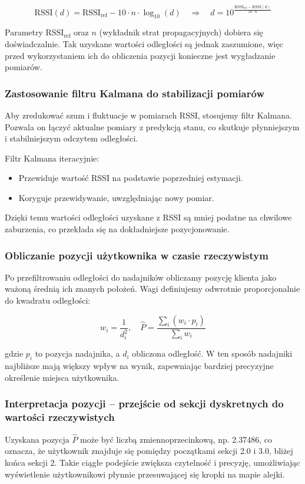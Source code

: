 \[
\text{RSSI}(d) = \text{RSSI}_{\text{ref}} - 10 \cdot n \cdot \log_{10}(d) \quad \Rightarrow \quad d = 10^{\frac{\text{RSSI}_{\text{ref}} - \text{RSSI}(d)}{10 \cdot n}}
\]

Parametry \(\text{RSSI}_{\text{ref}}\) oraz \( n \) (wykładnik strat propagacyjnych) dobiera się doświadczalnie. Tak uzyskane wartości odległości są jednak zaszumione, więc przed wykorzystaniem ich do obliczenia pozycji konieczne jest wygładzanie pomiarów.

\subsubsection{Zastosowanie filtru Kalmana do stabilizacji pomiarów}
Aby zredukować szum i fluktuacje w pomiarach RSSI, stosujemy filtr Kalmana. Pozwala on łączyć aktualne pomiary z predykcją stanu, co skutkuje płynniejszym i stabilniejszym odczytem odległości.

Filtr Kalmana iteracyjnie:
\begin{itemize}
    \item Przewiduje wartość RSSI na podstawie poprzedniej estymacji.
    \item Koryguje przewidywanie, uwzględniając nowy pomiar.
\end{itemize}

Dzięki temu wartości odległości uzyskane z RSSI są mniej podatne na chwilowe zaburzenia, co przekłada się na dokładniejsze pozycjonowanie.

\subsubsection{Obliczanie pozycji użytkownika w czasie rzeczywistym}
Po przefiltrowaniu odległości do nadajników obliczamy pozycję klienta jako ważoną średnią ich znanych położeń. Wagi definiujemy odwrotnie proporcjonalnie do kwadratu odległości:

\[
w_i = \frac{1}{d_i^2}, \quad \hat{P} = \frac{\sum_i (w_i \cdot p_i)}{\sum_i w_i}
\]

gdzie \( p_i \) to pozycja nadajnika, a \( d_i \) obliczona odległość. W ten sposób nadajniki najbliższe mają większy wpływ na wynik, zapewniając bardziej precyzyjne określenie miejsca użytkownika.

\subsubsection{Interpretacja pozycji – przejście od sekcji dyskretnych do wartości rzeczywistych}
Uzyskana pozycja \(\hat{P}\) może być liczbą zmiennoprzecinkową, np. 2.37486, co oznacza, że użytkownik znajduje się pomiędzy początkami sekcji 2.0 i 3.0, bliżej końca sekcji 2. Takie ciągłe podejście zwiększa czytelność i precyzję, umożliwiając wyświetlenie użytkownikowi płynnie przesuwającej się kropki na mapie alejki.

